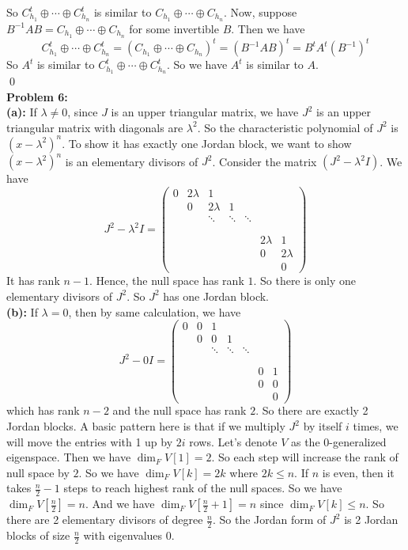 \documentclass[12pt]{amsart}
\begin{document}
So $C_{h_1}^t\oplus \cdots \oplus C_{h_n}^t$ is similar to $C_{h_1}\oplus \cdots \oplus C_{h_n}$. Now, suppose $B^{-1}AB=C_{h_1}\oplus \cdots \oplus C_{h_n}$ for some invertible $B$. Then we have 
\[C_{h_1}^t\oplus \cdots \oplus C_{h_n}^t=(C_{h_1}\oplus \cdots \oplus C_{h_n})^t=(B^{-1}AB)^t=B^tA^t(B^{-1})^t\]
So $A^t$ is similar to $C_{h_1}^t\oplus \cdots \oplus C_{h_n}^t$. So we have $A^t$ is similar to $A$.
\\\qed\\
\textbf{Problem 6:} \\
\textbf{(a): }If $\lambda\neq 0$, since $J$ is an upper triangular matrix, we have $J^2$ is an upper triangular matrix with diagonals are $\lambda^2$. So the characteristic polynomial of $J^2$ is $(x-\lambda^2)^n$. To show it has exactly one Jordan block, we want to show $(x-\lambda^2)^n$ is an elementary divisors of $J^2$. Consider the matrix $(J^2-\lambda^2I)$.
We have 
\[J^2-\lambda^2I=\begin{pmatrix}
    0&2\lambda &1 &\ &\ &\ &\ \\
        \ & 0&2\lambda&1 &\ &\ &\ \\
        \ & \ &\ddots&\ddots&\ddots &\ &\ \\
        \\
        \\
        \ &\ &\ &\ &\   &2\lambda &1\\
        \ &\ &\ &\ &\ & 0 &2\lambda\\
        \ &\ &\ &\ &\  &\ &0
\end{pmatrix}\]
It has rank $n-1$. Hence, the null space has rank $1$. So there is only one elementary divisors of $J^2$. So $J^2$ has one Jordan block.\\
\textbf{(b): } If $\lambda=0$, then by same calculation, we have 
\[J^2-0I=\begin{pmatrix}
    0&0 &1 &\ &\ &\ &\ \\
        \ & 0&0 &1 &\ &\ \\
        \ & \ &\ddots&\ddots&\ddots &\ &\ \\
        \\
        \\
        \ &\ &\ &\ &\   &0&1\\
        \ &\ &\ &\ &\ & 0 &0\\
        \ &\ &\ &\ &\  &\ &0
\end{pmatrix}\]
which has rank $n-2$ and the null space has rank $2$. So there are exactly 2 Jordan blocks. A basic pattern here is that if we multiply $J^2$ by itself $i$ times, we will move the entries with 1 up by $2i$ rows. Let's denote $V$ as the 0-generalized eigenspace. Then we have $\dim_F V[1]=2$. So each step will increase the rank of null space by $2$. So we have $\dim_F V[k]=2k$ where $2k\leq n$. If $n$ is even, then it takes $\frac{n}{2}-1$ steps to reach highest rank of the null spaces. So we have $\dim_F V[\frac{n}{2}]=n$. And we have $\dim_FV[\frac{n}{2}+1]=n$ since $\dim_FV[k]\leq n$. So there are 2 elementary divisors of degree $\frac{n}{2}$. So the Jordan form of $J^2$ is 2 Jordan blocks of size $\frac{n}{2}$ with eigenvalues 0.\\
\end{document}
